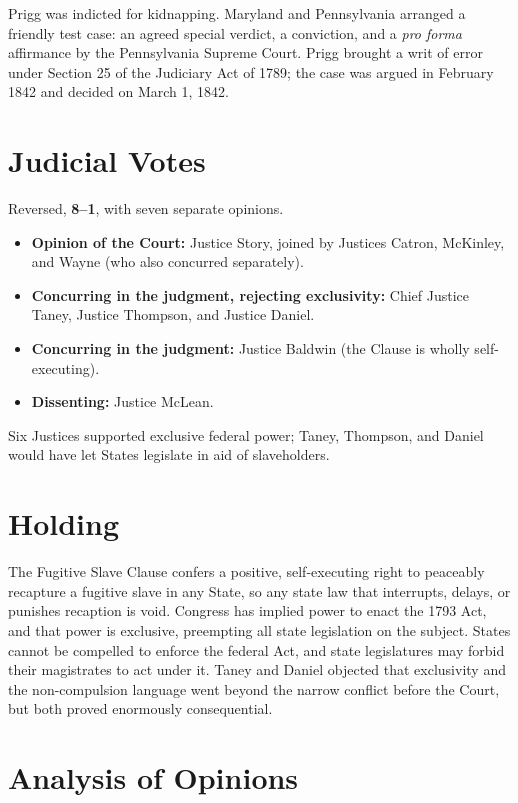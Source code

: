 \documentclass[12pt]{article}
\begin{document}
Prigg was indicted for kidnapping. Maryland and Pennsylvania arranged a friendly test case: an agreed special verdict, a conviction, and a \textit{pro forma} affirmance by the Pennsylvania Supreme Court. Prigg brought a writ of error under Section 25 of the Judiciary Act of 1789; the case was argued in February 1842 and decided on March 1, 1842.

\section{Judicial Votes}

Reversed, \textbf{8--1}, with seven separate opinions.
\begin{itemize}
\item \textbf{Opinion of the Court:} Justice Story, joined by Justices Catron, McKinley, and Wayne (who also concurred separately).
\item \textbf{Concurring in the judgment, rejecting exclusivity:} Chief Justice Taney, Justice Thompson, and Justice Daniel.
\item \textbf{Concurring in the judgment:} Justice Baldwin (the Clause is wholly self-executing).
\item \textbf{Dissenting:} Justice McLean.
\end{itemize}
Six Justices supported exclusive federal power; Taney, Thompson, and Daniel would have let States legislate in aid of slaveholders.

\section{Holding}

The Fugitive Slave Clause confers a positive, self-executing right to peaceably recapture a fugitive slave in any State, so any state law that interrupts, delays, or punishes recaption is void. Congress has implied power to enact the 1793 Act, and that power is exclusive, preempting all state legislation on the subject. States cannot be compelled to enforce the federal Act, and state legislatures may forbid their magistrates to act under it. Taney and Daniel objected that exclusivity and the non-compulsion language went beyond the narrow conflict before the Court, but both proved enormously consequential.

\section{Analysis of Opinions}
\end{document}
